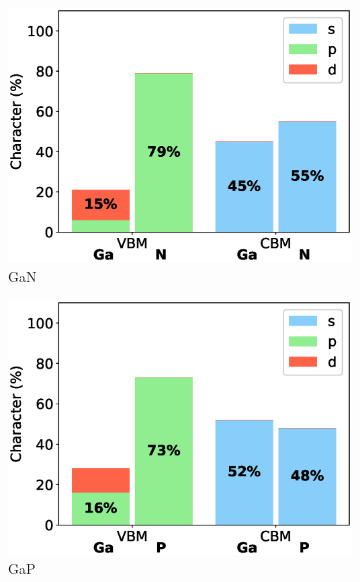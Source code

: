 \begin{figure}[!ht]
\begin{subfigure}{0.3\textwidth}
  \includegraphics[width=\linewidth]{images/gan_3d_composition.eps}
  \caption{GaN}
\end{subfigure}\hfil %
\begin{subfigure}{0.3\textwidth}
  \includegraphics[width=\linewidth]{images/gap_3d_composition.eps}
  \caption{GaP}
\end{subfigure}\hfil %
\begin{subfigure}{0.3\textwidth}

\end{subfigure}
\end{figure}
